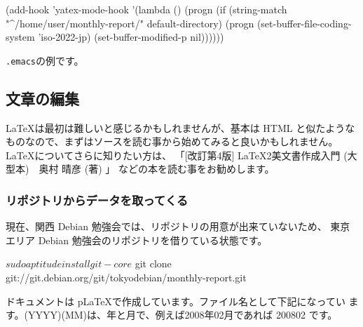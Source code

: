 \documentclass[mingoth,a4paper]{jsarticle}
\begin{document}
\begin{commandline}
(add-hook 'yatex-mode-hook
	  '(lambda () 
	     (progn 
	       (if (string-match "^/home/user/monthly-report/" default-directory)
		   (progn (set-buffer-file-coding-system 'iso-2022-jp)
			  (set-buffer-modified-p nil))))))
\end{commandline}

\texttt{.emacs}の例です。


\subsection{文章の編集}

\LaTeX は最初は難しいと感じるかもしれませんが、基本は HTML と似たような
ものなので、まずはソースを読む事から始めてみると良いかもしれません。
\LaTeX についてさらに知りたい方は、
「[改訂第4版] \LaTeX 2美文書作成入門
(大型本)　奥村 晴彦 (著) 」
などの本を読む事をお勧めします。

\subsubsection{リポジトリからデータを取ってくる}
現在、関西 Debian 勉強会では、リポジトリの用意が出来ていないため、
東京エリア Debian 勉強会のリポジトリを借りている状態です。

\begin{commandline}
 $ sudo aptitude install git-core
 $ git clone git://git.debian.org/git/tokyodebian/monthly-report.git
\end{commandline}

ドキュメントは p\LaTeX{}で作成しています。ファイル名として下記になってい
ます。(YYYY)(MM)は、年と月で、例えば2008年02月であれば 200802 です。
\end{document}
